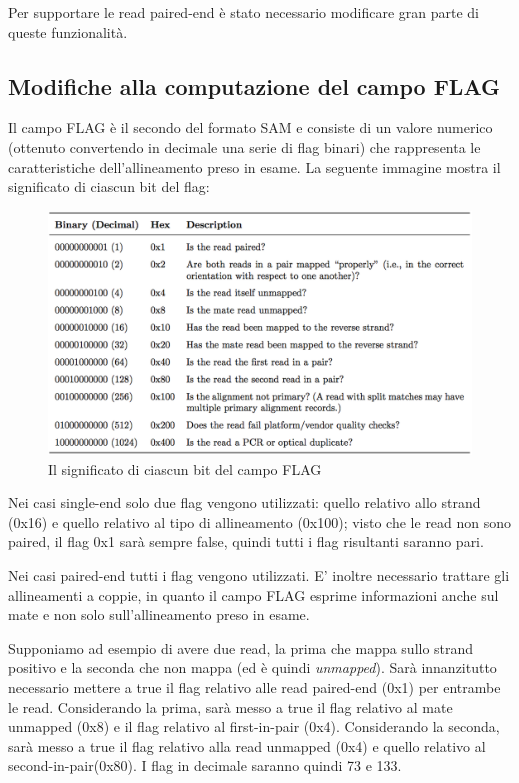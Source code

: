 Per supportare le read paired-end è stato necessario modificare gran parte di queste funzionalità.

\newpage

\subsection{Modifiche alla computazione del campo FLAG}
Il campo FLAG è il secondo del formato SAM e consiste di un valore numerico (ottenuto convertendo in decimale una serie di flag binari) che rappresenta le caratteristiche dell'allineamento preso in esame. La seguente immagine mostra il significato di ciascun bit del flag:

\begin{figure}[h]
	\centering
	\includegraphics[width=\linewidth]{images/samflag.png}
  \caption{Il significato di ciascun bit del campo FLAG }
  \label{fig:SAM Flags}
\end{figure}

Nei casi single-end solo due flag vengono utilizzati: quello relativo allo strand (0x16) e quello relativo al tipo di allineamento (0x100); visto che le read non sono paired, il flag 0x1 sarà sempre false, quindi tutti i flag risultanti saranno pari.

Nei casi paired-end tutti i flag vengono utilizzati. E' inoltre necessario trattare gli allineamenti a coppie, in quanto il campo FLAG esprime informazioni anche sul mate e non solo sull'allineamento preso in esame. 

Supponiamo ad esempio di avere due read, la prima che mappa sullo strand positivo e la seconda che non mappa (ed è quindi \textit{unmapped}). Sarà innanzitutto necessario mettere a true il flag relativo alle read paired-end (0x1) per entrambe le read. Considerando la prima, sarà messo a true il flag relativo al mate unmapped (0x8) e il flag relativo al first-in-pair (0x4). Considerando la seconda, sarà messo a true il flag relativo alla read unmapped (0x4) e quello relativo al second-in-pair(0x80). I flag in decimale saranno quindi 73 e 133.

